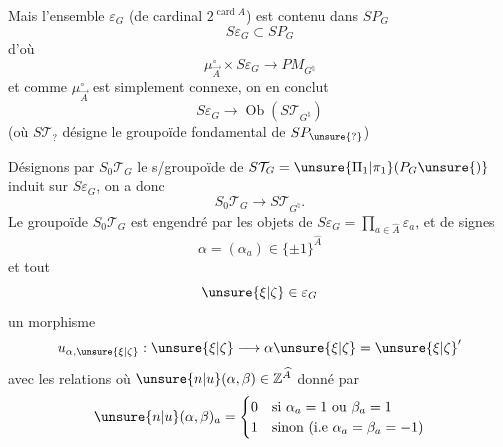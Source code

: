 Mais  l'ensemble $\varepsilon_G$
(de cardinal $2^{\operatorname{card} A}$) est contenu dans $SP_G$
\[
S\varepsilon_G\subset SP_G
\]
d'où
\[
\mu_{\vec A}^{\circ}\times S\varepsilon_G\longrightarrow PM_{G^\natural}
\]
et comme $\mu_{\vec A}^{\circ}$ est simplement connexe, on en conclut
\[
S\varepsilon_G\longrightarrow\operatorname{Ob}(S\mathcal T_{G^\natural})
\]
(où $S\mathcal T_{?}$ désigne le groupoïde fondamental de $SP_{\unsure{?}}$)

Désignons par $S_0\mathcal T_G$ le s/groupoïde de $S\mathcal T_G=\unsure{\Pi_1|\pi_1}(P_G\unsure{)}$
induit sur $S\varepsilon_G$, on a donc
\[
S_0\mathcal T_G\longrightarrow S\mathcal T_{G^\natural}.
\]
Le groupoïde $S_0\mathcal T_G$ est engendré par les objets de
$S\varepsilon_G=\prod_{a\in\widehat A}\varepsilon_a$, et
 
de signes
\[
\alpha=(\alpha_a)\in\{\pm1\}^{\widehat A}
\]
et tout
\[
\unsure{\xi|\zeta}\in\varepsilon_G
\]
un morphisme
\[
u_{\alpha,\unsure{\xi|\zeta}}:\unsure{\xi|\zeta}\longrightarrow\alpha\unsure{\xi|\zeta}=\unsure{\xi|\zeta}'
\]
avec les relations
où $\unsure{n|u}(\alpha,\beta)\in\mathbb Z^{\widehat A}$ donné par
\[
\unsure{n|u}(\alpha,\beta)_a=\begin{cases}
0&\text{si }\alpha_a=1\text{ ou }\beta_a=1\\
1&\text{sinon (i.e }\alpha_a=\beta_a=-1\text{)}
\end{cases}
\]

